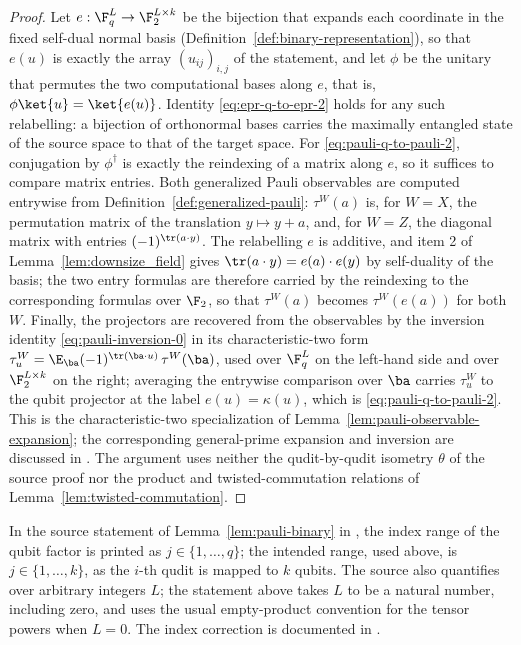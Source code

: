 \begin{proof}
	\leanok
	Let
	$e : \F_q^L \to \F_2^{L \times k}$ be the bijection that expands each
	coordinate in the fixed self-dual normal basis
	(Definition~\ref{def:binary-representation}), so that $e(u)$ is exactly the
	array $(u_{ij})_{i,j}$ of the statement, and let $\phi$ be the unitary that
	permutes the two computational bases along $e$, that is,
	$\phi \ket{u} = \ket{e(u)}$. Identity \eqref{eq:epr-q-to-epr-2} holds for
	any such relabelling: a bijection of orthonormal bases carries the maximally
	entangled state of the source space to that of the target space. For
	\eqref{eq:pauli-q-to-pauli-2}, conjugation by $\phi^\dagger$ is exactly
	the reindexing of a matrix along $e$, so it suffices to compare matrix
	entries. Both generalized Pauli observables are computed entrywise from
	Definition~\ref{def:generalized-pauli}: $\tau^W(a)$ is, for $W = X$, the
	permutation matrix of the translation $y \mapsto y + a$, and, for $W = Z$,
	the diagonal matrix with entries $(-1)^{\tr(a \cdot y)}$. The relabelling
	$e$ is additive, and item 2 of Lemma~\ref{lem:downsize_field} gives
	$\tr(a \cdot y) = e(a) \cdot e(y)$ by self-duality of the basis; the two
	entry formulas are therefore carried by the reindexing to the corresponding
	formulas over $\F_2$, so that $\tau^W(a)$ becomes $\tau^W(e(a))$ for both
	$W$. Finally, the projectors are recovered from the observables by the
	inversion identity \eqref{eq:pauli-inversion-0} in its characteristic-two
	form $\tau^W_u = \E_{\ba} (-1)^{\tr(\ba \cdot u)}\, \tau^W(\ba)$, used
	over $\F_q^L$ on the left-hand side and over $\F_2^{L \times k}$ on the
	right; averaging the entrywise comparison
	over $\ba$ carries $\tau^W_u$ to the qubit projector at the label
	$e(u) = \kappa(u)$, which is \eqref{eq:pauli-q-to-pauli-2}. This is the
	characteristic-two specialization of
	Lemma~\ref{lem:pauli-observable-expansion}; the corresponding general-prime
	expansion and inversion are discussed in
	\cite{gap:qpbt_characteristic-two-pauli-scope}. The argument uses neither
	the qudit-by-qudit isometry $\theta$ of the source
	proof nor the product and twisted-commutation relations of
	Lemma~\ref{lem:twisted-commutation}.
\end{proof}

\begin{remark}\label{rem:pauli-binary-source}
	In the source statement of Lemma~\ref{lem:pauli-binary} in
	\cite{Ji2020MIPStar}, the index range of the qubit factor is printed as
	$j \in \{1, \dots, q\}$; the intended range, used above, is
	$j \in \{1, \dots, k\}$, as the $i$-th qudit is mapped to $k$ qubits. The
	source also quantifies over arbitrary integers $L$; the statement above
	takes $L$ to be a natural number, including zero, and uses the usual
	empty-product convention for the tensor powers when $L=0$.  The index
	correction is documented in \cite{gap:qpbt_pauli-binary-factor-index}.
\end{remark}
